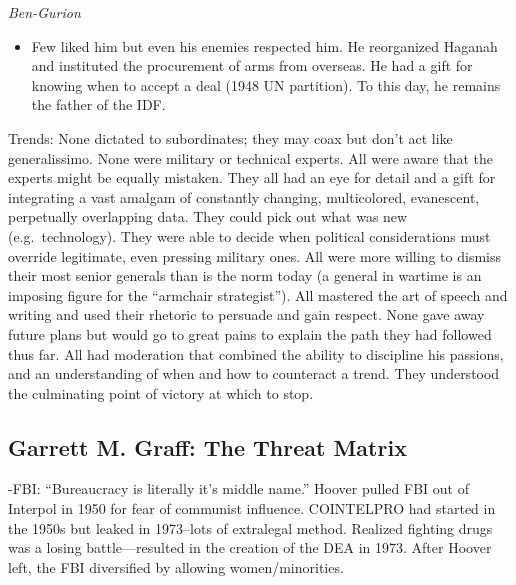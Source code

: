 \documentclass[
]{article}
\providecommand{\tightlist}{%
  \setlength{\itemsep}{0pt}\setlength{\parskip}{0pt}}
\begin{document}
\emph{Ben-Gurion}

\begin{itemize}
\tightlist
\item
  Few liked him but even his enemies respected him. He reorganized
  Haganah and instituted the procurement of arms from overseas. He had a
  gift for knowing when to accept a deal (1948 UN partition). To this
  day, he remains the father of the IDF.
\end{itemize}

Trends: None dictated to subordinates; they may coax but don't act like
generalissimo. None were military or technical experts. All were aware
that the experts might be equally mistaken. They all had an eye for
detail and a gift for integrating a vast amalgam of constantly changing,
multicolored, evanescent, perpetually overlapping data. They could pick
out what was new (e.g.~technology). They were able to decide when
political considerations must override legitimate, even pressing
military ones. All were more willing to dismiss their most senior
generals than is the norm today (a general in wartime is an imposing
figure for the ``armchair strategist''). All mastered the art of speech
and writing and used their rhetoric to persuade and gain respect. None
gave away future plans but would go to great pains to explain the path
they had followed thus far. All had moderation that combined the ability
to discipline his passions, and an understanding of when and how to
counteract a trend. They understood the culminating point of victory at
which to stop.

\hypertarget{garrett-m.-graff-the-threat-matrix}{%
\subsection{Garrett M. Graff: The Threat
Matrix}\label{garrett-m.-graff-the-threat-matrix}}

-FBI: ``Bureaucracy is literally it's middle name.'' Hoover pulled FBI
out of Interpol in 1950 for fear of communist influence. COINTELPRO had
started in the 1950s but leaked in 1973--lots of extralegal method.
Realized fighting drugs was a losing battle---resulted in the creation
of the DEA in 1973. After Hoover left, the FBI diversified by allowing
women/minorities.
\end{document}
